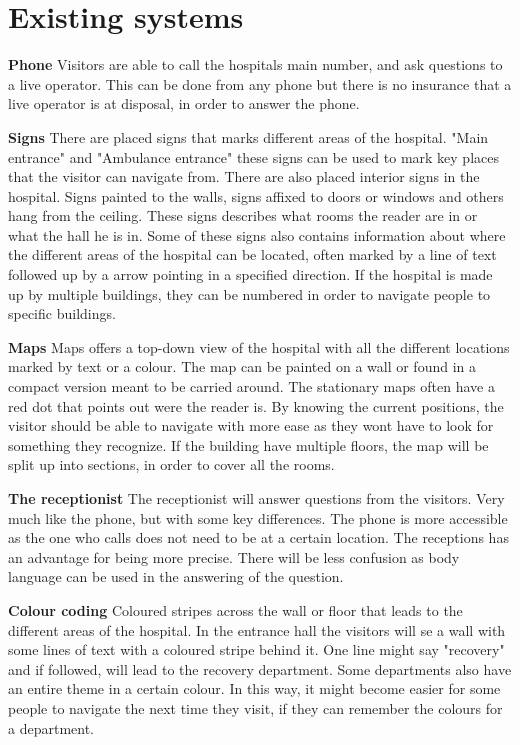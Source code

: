 \section{Existing systems} %
\label{sec:existing_systems}


\textbf{Phone}
Visitors are able to call the hospitals main number, and ask questions to a live operator. This can be done from any phone but there is no insurance that a live operator is at disposal, in order to answer the phone.

\textbf{Signs}
There are placed signs that marks different areas of the hospital. "Main entrance" and "Ambulance entrance" these signs can be used to mark key places that the visitor can navigate from.
There are also placed interior signs in the hospital. Signs painted to the walls, signs affixed to doors or windows and others hang from the ceiling. These signs describes what rooms the reader are in or what the hall he is in. Some of these signs also contains information about where the different areas of the hospital can be located, often marked by a line of text followed up by a arrow pointing in a specified direction. If the hospital is made up by multiple buildings, they can be numbered in order to navigate people to specific buildings.

\textbf{Maps}
Maps offers a top-down view of the hospital with all the different locations marked by text or a colour. The map can be painted on a wall or found in a compact version meant to be carried around. The stationary maps often have a red dot that points out were the reader is. By knowing the current positions, the visitor should be able to navigate with more ease as they wont have to look for something they recognize. If the building have multiple floors, the map will be split up into sections, in order to cover all the rooms.

\textbf{The receptionist}
The receptionist will answer questions from the visitors. Very much like the phone, but with some key differences. The phone is more accessible as the one who calls does not need to be at a certain location. The receptions has an advantage for being more precise. There will be less confusion as body language can be used in the answering of the question.

\textbf{Colour coding}
Coloured stripes across the wall or floor that leads to the different areas of the hospital. In the entrance hall the visitors will se a wall with some lines of text with a coloured stripe behind it. One line might say "recovery" and if followed, will lead to the recovery department. Some departments also have an entire theme in a certain colour. In this way, it might become easier for some people to navigate the next time they visit, if they can remember the colours for a department. 

